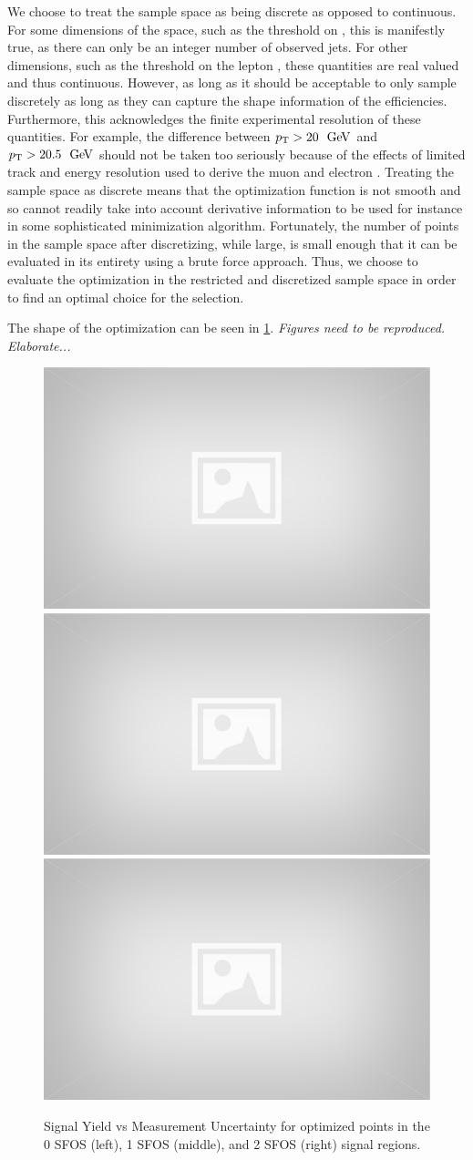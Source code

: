 We choose to treat the sample space as being discrete as opposed
to continuous. For some dimensions of the space, such as 
the threshold on \njet, this is manifestly true, as there 
can only be an integer number of observed jets. 
For other dimensions, such as the threshold on the lepton
\pt, these quantities are real valued and thus continuous.
However, as long as 
it should be acceptable to only sample 
discretely as long as they can capture the shape information of 
the efficiencies. %
Furthermore, 
this acknowledges the finite  experimental resolution of these 
quantities. For example,
the difference between $\pt > 20~\GeV$ and $\pt > 20.5~\GeV$
should not be taken too seriously because of the effects of limited
track and energy resolution used to derive the muon and electron \pt.
Treating the sample space as discrete means that the optimization
function is not smooth and so cannot readily take into account
derivative information to be used for instance 
in some sophisticated minimization algorithm.
Fortunately, the number of points in the sample space after discretizing, 
while large, is small enough that it can be evaluated in its entirety
using a brute force approach. Thus, we choose to evaluate the 
optimization in the restricted and discretized sample space in order
to find an optimal choice for the selection.


The shape of the optimization can be seen in \fig\ref{fig:optimization}.
\emph{Figures need to be reproduced. Elaborate...} 


\begin{figure}[ht!]
\centering
\includegraphics[width=0.3\columnwidth]{figures/placeholder.eps}
\includegraphics[width=0.3\columnwidth]{figures/placeholder.eps}
\includegraphics[width=0.3\columnwidth]{figures/placeholder.eps}
\caption{Signal Yield vs Measurement Uncertainty for optimized points 
in the 0 SFOS (left), 1 SFOS (middle), and 2 SFOS (right) signal regions.}
\label{fig:optimization}
\end{figure}



